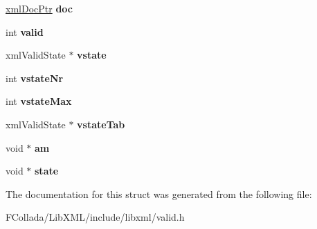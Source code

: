 \begin{DoxyCompactItemize}
\item 
\hypertarget{struct__xmlValidCtxt_a1f084e858e3a50fa87696738c6d6a019}{
\hyperlink{struct__xmlDoc}{xmlDocPtr} {\bfseries doc}}
\label{struct__xmlValidCtxt_a1f084e858e3a50fa87696738c6d6a019}

\item 
\hypertarget{struct__xmlValidCtxt_ac31686aaeedb48c46b453f98c51597d2}{
int {\bfseries valid}}
\label{struct__xmlValidCtxt_ac31686aaeedb48c46b453f98c51597d2}

\item 
\hypertarget{struct__xmlValidCtxt_a70d2a592a1909a626ae50db98a9ed136}{
xmlValidState $\ast$ {\bfseries vstate}}
\label{struct__xmlValidCtxt_a70d2a592a1909a626ae50db98a9ed136}

\item 
\hypertarget{struct__xmlValidCtxt_af1d9fbfcf068c8dad6349fd677effc22}{
int {\bfseries vstateNr}}
\label{struct__xmlValidCtxt_af1d9fbfcf068c8dad6349fd677effc22}

\item 
\hypertarget{struct__xmlValidCtxt_a606af121a4d33a9ec572147b17682125}{
int {\bfseries vstateMax}}
\label{struct__xmlValidCtxt_a606af121a4d33a9ec572147b17682125}

\item 
\hypertarget{struct__xmlValidCtxt_a81fb3ed51e4a63ddaf5a7541f3563ebc}{
xmlValidState $\ast$ {\bfseries vstateTab}}
\label{struct__xmlValidCtxt_a81fb3ed51e4a63ddaf5a7541f3563ebc}

\item 
\hypertarget{struct__xmlValidCtxt_adef83a3cd73508675a7b1246dc6e9dc1}{
void $\ast$ {\bfseries am}}
\label{struct__xmlValidCtxt_adef83a3cd73508675a7b1246dc6e9dc1}

\item 
\hypertarget{struct__xmlValidCtxt_a88d110c3238a8766436bf8da59bf9d0c}{
void $\ast$ {\bfseries state}}
\label{struct__xmlValidCtxt_a88d110c3238a8766436bf8da59bf9d0c}

\end{DoxyCompactItemize}


The documentation for this struct was generated from the following file:\begin{DoxyCompactItemize}
\item 
FCollada/LibXML/include/libxml/valid.h\end{DoxyCompactItemize}

